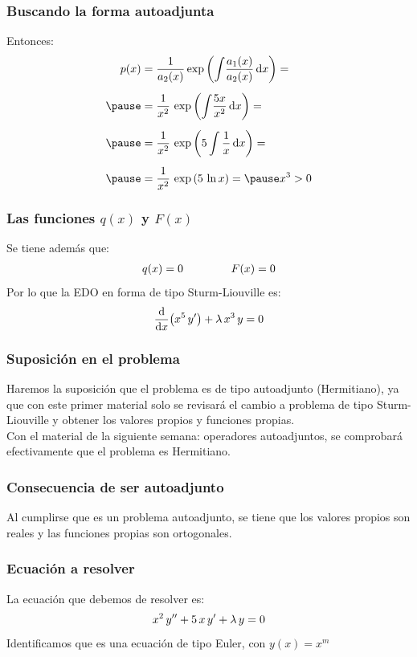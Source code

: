 \documentclass[12pt]{beamer}
\begin{document}
\begin{frame}
\frametitle{Buscando la forma autoadjunta}
Entonces:
\pause
\begin{eqnarray*}
\begin{aligned}
p(x) &= \dfrac{1}{a_{2}(x)} \exp \left( \scaleint{5ex} \dfrac{a_{1}(x)}{a_{2}(x)} \dd{x} \right) = \\[0.5em] \pause
&= \dfrac{1}{x^{2}} \, \exp \left( \scaleint{5ex} \dfrac{5 x}{x^{2}} \dd{x} \right) = \\[0.5em] \pause
&= \dfrac{1}{x^{2}} \,  \exp \left( 5 \, \scaleint{5ex} \, \dfrac{1}{x} \dd{x} \right) = \\[0.5em] \pause
&= \dfrac{1}{x^{2}} \,  \exp \left( 5 \, \ln x \right) = \pause x^{3} > 0
\end{aligned}
\end{eqnarray*}
\end{frame}
\begin{frame}
\frametitle{Las funciones $q(x)$ y $F(x)$}
Se tiene además que:
\pause
\begin{align*}
q(x) = 0 \hspace{1.5cm} F(x) = 0
\end{align*}
\pause
Por lo que la EDO en forma de tipo Sturm-Liouville es:
\pause
\begin{align*}
\dv{x} \big( x^{5} \, {y}^{\prime} \big) + \lambda \, x^{3} \, y = 0
\end{align*}
\end{frame}
\begin{frame}
\frametitle{Suposición en el problema}
Haremos la suposición que el problema es de tipo autoadjunto (Hermitiano), ya que con este primer material solo se revisará el cambio a problema de tipo Sturm-Liouville y obtener los valores propios y funciones propias.
\\
\bigskip
\pause
Con el material de la siguiente semana: operadores autoadjuntos, se comprobará efectivamente que el problema es Hermitiano.
\end{frame}
\begin{frame}
\frametitle{Consecuencia de ser autoadjunto}
Al cumplirse que es un problema autoadjunto, se tiene que los valores propios son reales y las funciones propias son ortogonales.
\end{frame}
\begin{frame}
\frametitle{Ecuación a resolver}
La ecuación que debemos de resolver es:
\begin{align*}
x^{2} \, {y}^{\prime \prime} + 5 \, x \, {y}^{\prime} + \lambda \, y = 0
\end{align*}
\pause
Identificamos que es una ecuación de tipo Euler, con $y(x) = x^{m}$
\end{frame}
\end{document}
